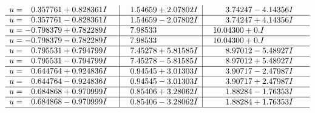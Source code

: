 \documentclass[1p]{elsarticle_modified}
\theoremstyle{definition}
\begin{document}
$$\begin{array}{c|c|c}
\begin{aligned}
u &= \phantom{-}0.357761 + 0.828361 I\end{aligned}
 & \phantom{-}1.54659 + 2.07802 I & \phantom{-}3.74247 - 4.14356 I \\ \hline\begin{aligned}
u &= \phantom{-}0.357761 - 0.828361 I\end{aligned}
 & \phantom{-}1.54659 - 2.07802 I & \phantom{-}3.74247 + 4.14356 I \\ \hline\begin{aligned}
u &= -0.798379 + 0.782289 I\end{aligned}
 & \phantom{-}7.98533\phantom{ +0.000000I} & \phantom{-}10.04300 + 0. I\phantom{ +0.000000I} \\ \hline\begin{aligned}
u &= -0.798379 - 0.782289 I\end{aligned}
 & \phantom{-}7.98533\phantom{ +0.000000I} & \phantom{-}10.04300 + 0. I\phantom{ +0.000000I} \\ \hline\begin{aligned}
u &= \phantom{-}0.795531 + 0.794799 I\end{aligned}
 & \phantom{-}7.45278 + 5.81585 I & \phantom{-}8.97012 - 5.48927 I \\ \hline\begin{aligned}
u &= \phantom{-}0.795531 - 0.794799 I\end{aligned}
 & \phantom{-}7.45278 - 5.81585 I & \phantom{-}8.97012 + 5.48927 I \\ \hline\begin{aligned}
u &= \phantom{-}0.644764 + 0.924836 I\end{aligned}
 & \phantom{-}0.94545 + 3.01303 I & \phantom{-}3.90717 - 2.47987 I \\ \hline\begin{aligned}
u &= \phantom{-}0.644764 - 0.924836 I\end{aligned}
 & \phantom{-}0.94545 - 3.01303 I & \phantom{-}3.90717 + 2.47987 I \\ \hline\begin{aligned}
u &= \phantom{-}0.684868 + 0.970999 I\end{aligned}
 & \phantom{-}0.85406 + 3.28062 I & \phantom{-}1.88284 - 1.76353 I \\ \hline\begin{aligned}
u &= \phantom{-}0.684868 - 0.970999 I\end{aligned}
 & \phantom{-}0.85406 - 3.28062 I & \phantom{-}1.88284 + 1.76353 I\\
 \hline 

\end{array}$$
\end{document}
